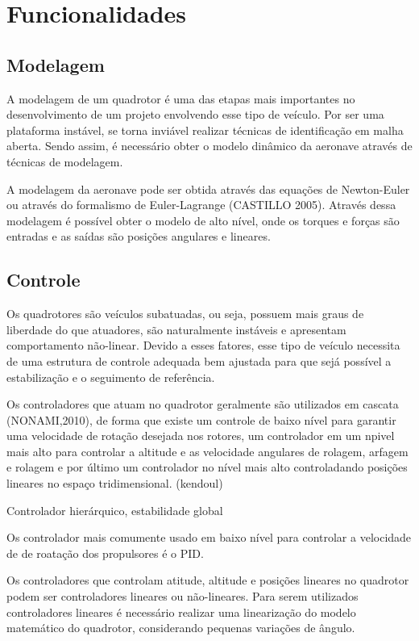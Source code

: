 \section{Funcionalidades}

\subsection{Modelagem}
A modelagem de um quadrotor é uma das etapas mais importantes no desenvolvimento de um projeto envolvendo esse tipo de veículo. Por ser uma plataforma instável, se torna inviável realizar técnicas de identificação em malha aberta. Sendo assim, é necessário obter o modelo dinâmico da aeronave através de técnicas de modelagem.

A modelagem da aeronave pode ser obtida através das equações de Newton-Euler ou através do formalismo de Euler-Lagrange (CASTILLO 2005). Através dessa modelagem é possível obter o modelo de alto nível, onde os torques e forças são entradas e as saídas são posições angulares e lineares. 

\subsection{Controle}
Os quadrotores são veículos subatuadas, ou seja, possuem mais graus de liberdade do que atuadores, são naturalmente instáveis e apresentam comportamento não-linear. Devido a esses fatores, esse tipo de veículo necessita de uma estrutura de controle adequada bem ajustada para que sejá possível a estabilização e o seguimento de referência.

Os controladores que atuam no quadrotor geralmente são utilizados em cascata (NONAMI,2010), de forma que existe um controle de baixo nível para garantir uma velocidade de rotação desejada nos rotores, um controlador em um npivel mais alto para controlar a altitude e as velocidade angulares de rolagem, arfagem e rolagem e por último um controlador no nível mais alto controladando posições lineares no espaço tridimensional. (kendoul)

Controlador hierárquico, estabilidade global

Os controlador mais comumente usado em baixo nível para controlar a velocidade de de roatação dos propulsores é o PID. 

Os controladores que controlam atitude, altitude e posições lineares no quadrotor podem ser controladores lineares ou não-lineares. Para serem utilizados controladores lineares é necessário realizar uma linearização do modelo matemático do quadrotor, considerando pequenas variações de ângulo.

